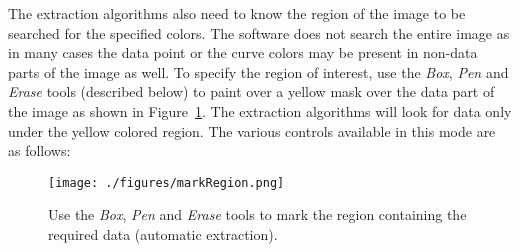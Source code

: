 \documentclass[letterpaper, 11pt]{article}
\begin{document}
The extraction algorithms also need to know the region of the image to be searched for the specified colors. The software does not search the entire image as in many cases the data point or the curve colors may be present in non-data parts of the image as well. To specify the region of interest, use the \emph{Box}, \emph{Pen} and \emph{Erase} tools (described below) to paint over a yellow mask over the data part of the image as shown in Figure~\ref{fig:markRegion}. The extraction algorithms will look for data only under the yellow colored region. The various controls available in this mode are as follows:
\begin{figure}
\begin{center}
\texttt{[image: ./figures/markRegion.png]}
\caption{Use the \emph{Box}, \emph{Pen} and \emph{Erase} tools to mark the region containing the required data (automatic extraction).}
\label{fig:markRegion}
\end{center}
\end{figure}
\end{document}
